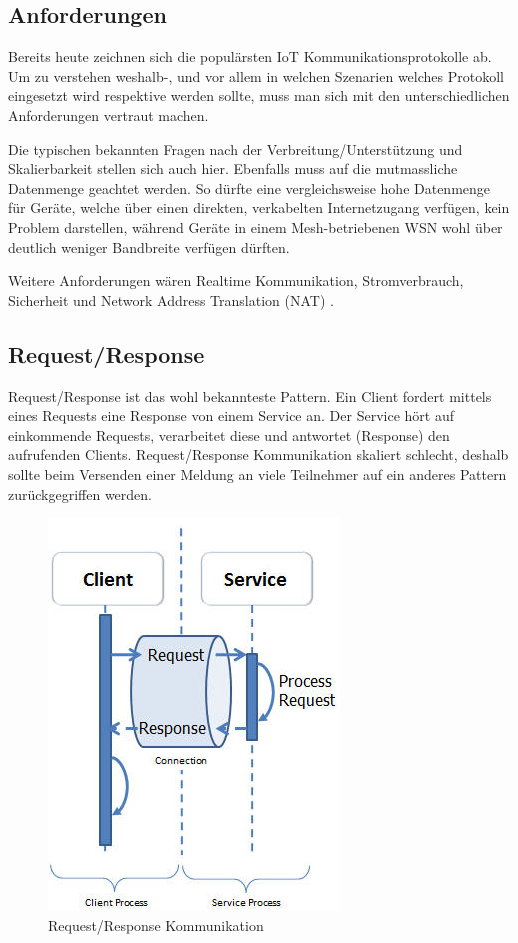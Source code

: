 \subsection{Anforderungen}
Bereits heute zeichnen sich die populärsten IoT Kommunikationsprotokolle ab. Um zu verstehen weshalb-, und vor allem in welchen Szenarien welches Protokoll eingesetzt wird respektive werden sollte, muss man sich mit den unterschiedlichen Anforderungen vertraut machen.

Die typischen bekannten Fragen nach der Verbreitung/Unterstützung und Skalierbarkeit stellen sich auch hier. Ebenfalls muss auf die mutmassliche Datenmenge geachtet werden. So dürfte eine vergleichsweise hohe Datenmenge für Geräte, welche über einen direkten, verkabelten Internetzugang verfügen, kein Problem darstellen, während Geräte in einem Mesh-betriebenen WSN wohl über deutlich weniger Bandbreite verfügen dürften.

Weitere Anforderungen wären Realtime Kommunikation, Stromverbrauch, Sicherheit und Network Address Translation (NAT) \cite{Obermaier15}.
\subsection{Request/Response}
Request/Response ist das wohl bekannteste Pattern. Ein Client fordert mittels eines Requests eine Response von einem Service an. Der Service hört auf einkommende Requests, verarbeitet diese und antwortet (Response) den aufrufenden Clients. Request/Response Kommunikation skaliert schlecht, deshalb sollte beim Versenden einer Meldung an viele Teilnehmer auf ein anderes Pattern zurückgegriffen werden. 
\begin{figure}[H]
\centering
\includegraphics[scale=0.8]{images/request-response.png}
\caption{Request/Response Kommunikation \cite{ReqRes}}
\end{figure}
